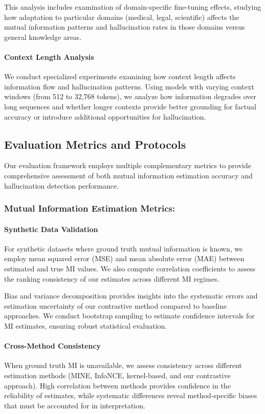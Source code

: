 This analysis includes examination of domain-specific fine-tuning effects, studying how adaptation to particular domains (medical, legal, scientific) affects the mutual information patterns and hallucination rates in those domains versus general knowledge areas.

\paragraph{Context Length Analysis}
We conduct specialized experiments examining how context length affects information flow and hallucination patterns. Using models with varying context windows (from 512 to 32,768 tokens), we analyze how information degrades over long sequences and whether longer contexts provide better grounding for factual accuracy or introduce additional opportunities for hallucination.

\subsection{Evaluation Metrics and Protocols}
\label{subsec:evaluation_metrics}

Our evaluation framework employs multiple complementary metrics to provide comprehensive assessment of both mutual information estimation accuracy and hallucination detection performance.

\subsubsection{Mutual Information Estimation Metrics:}

\paragraph{Synthetic Data Validation}
For synthetic datasets where ground truth mutual information is known, we employ mean squared error (MSE) and mean absolute error (MAE) between estimated and true MI values. We also compute correlation coefficients to assess the ranking consistency of our estimates across different MI regimes.

Bias and variance decomposition provides insights into the systematic errors and estimation uncertainty of our contrastive method compared to baseline approaches. We conduct bootstrap sampling to estimate confidence intervals for MI estimates, ensuring robust statistical evaluation.

\paragraph{Cross-Method Consistency}
When ground truth MI is unavailable, we assess consistency across different estimation methods (MINE, InfoNCE, kernel-based, and our contrastive approach). High correlation between methods provides confidence in the reliability of estimates, while systematic differences reveal method-specific biases that must be accounted for in interpretation.

